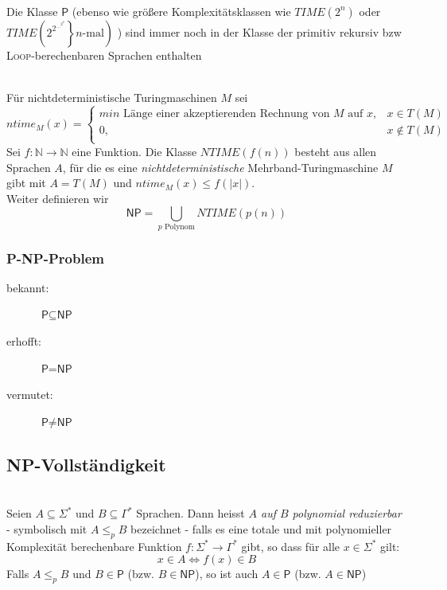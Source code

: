 \documentclass{scrartcl}
\begin{document}
\begin{shaded}
    \ \\Die Klasse $\mathsf{P}$ (ebenso wie größere Komplexitätsklassen wie $TIME(2^n)$ oder $TIME\left(\left.2^{2^{\dots^{2^2}}}\right\}n\textrm{-mal}\right) $ ) sind immer noch in der Klasse der primitiv rekursiv bzw \textsc{Loop}-berechenbaren Sprachen enthalten
\end{shaded}

\begin{shaded}
    \ \\Für nichtdeterministische Turingmaschinen $M$ sei
    \[ ntime_M(x)=
    \begin{cases}
        min \textrm{ Länge einer akzeptierenden Rechnung von } M \textrm{ auf } x, & x\in T(M) \\
        0, & x\not\in T(M) \\
    \end{cases}
     \]
     Sei $f:\mathds{N}\to \mathds{N}$ eine Funktion. Die Klasse $NTIME(f(n))$ besteht aus allen Sprachen $A$, für die es eine \emph{nichtdeterministische} Mehrband-Turingmaschine $M$ gibt mit $A=T(M)$ und $ntime_M(x)\leq f(|x|)$. \\
     Weiter definieren wir
     \[ \mathsf{NP} = \underset{p \textrm{ Polynom}}{\bigcup} NTIME(p(n)) \]
\end{shaded}

\subsubsection*{\textsf{P-NP}-Problem}
\begin{description}
    \item[bekannt:] $\textsf{P} \subseteq \textsf{NP}$
    \item[erhofft:] $\textsf{P} = \textsf{NP}$
    \item[vermutet:] $\textsf{P} \not= \textsf{NP}$
\end{description}

\begin{center}
\scalebox{.75}{}
\end{center}

\subsection*{\textsf{NP}-Vollständigkeit}
\begin{shaded}
    \ \\Seien $A\subseteq\Sigma^*$ und $B\subseteq\Gamma^*$ Sprachen. Dann heisst \emph{$A$ auf $B$ polynomial reduzierbar} - symbolisch mit $A\leq_p B$ bezeichnet - falls es eine totale und mit polynomieller Komplexität berechenbare Funktion $f:\Sigma^*\to\Gamma^*$ gibt, so dass für alle $x\in\Sigma^*$ gilt:
    \[ x\in A\Longleftrightarrow f(x)\in B \]
    Falls $A\leq_p B$ und $B\in\mathsf{P}$ (bzw. $B\in\mathsf{NP}$), so ist auch $A\in\mathsf{P}$ (bzw. $A\in\mathsf{NP}$)
\end{shaded}
\end{document}

